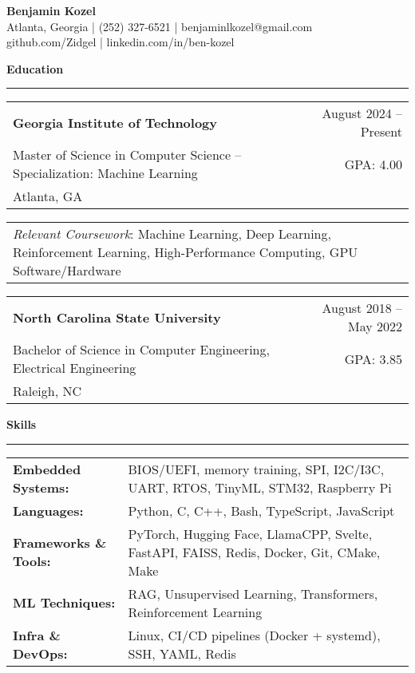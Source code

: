 \documentclass[a4paper,10pt]{article}
\begin{document}
{\centering
  {\Huge \textbf{Benjamin Kozel}} \\[4pt]
  \small Atlanta, Georgia \quad | \quad (252) 327-6521 \quad | \quad benjaminlkozel@gmail.com \\[2pt]
  \small github.com/Zidgel \quad | \quad linkedin.com/in/ben-kozel \par
}

\vspace{0.2in}

\textbf{Education}
\vspace{0.05in}
\hrule
\vspace{0.05in}

\begin{tabularx}{\textwidth}{X r}
\textbf{Georgia Institute of Technology} & August 2024 – Present \\
Master of Science in Computer Science – Specialization: Machine Learning & GPA: 4.00 \\
Atlanta, GA\\
\end{tabularx}

\begin{tabularx}{\textwidth}{X}
\textit{Relevant Coursework}: Machine Learning, Deep Learning, Reinforcement Learning, High-Performance Computing, GPU Software/Hardware
\end{tabularx}

\vspace{0.1in}

\begin{tabularx}{\textwidth}{X r}
\textbf{North Carolina State University} & August 2018 – May 2022 \\
Bachelor of Science in Computer Engineering, Electrical Engineering & GPA: 3.85 \\
Raleigh, NC\\
\end{tabularx}

\vspace{0.1in}
\textbf{Skills}
\vspace{0.05in}
\hrule
\vspace{0.05in}

\begin{tabularx}{\textwidth}{@{} l X @{}}
\textbf{Embedded Systems:} & BIOS/UEFI, memory training, SPI, I2C/I3C, UART, RTOS, TinyML, STM32, Raspberry Pi \\
\textbf{Languages:} & Python, C, C++, Bash, TypeScript, JavaScript \\
\textbf{Frameworks \& Tools:} & PyTorch, Hugging Face, LlamaCPP, Svelte, FastAPI, FAISS, Redis, Docker, Git, CMake, Make \\
\textbf{ML Techniques:} & RAG, Unsupervised Learning, Transformers, Reinforcement Learning \\
\textbf{Infra \& DevOps:} & Linux, CI/CD pipelines (Docker + systemd), SSH, YAML, Redis \\
\end{tabularx}
\end{document}
